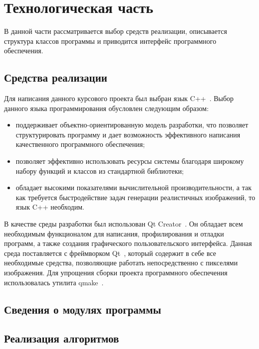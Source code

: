 \section{Технологическая часть}
В данной части рассматривается выбор средств реализации, описывается структура классов программы и приводится интерфейс программного обеспечения.

\subsection{Средства реализации}

Для написания данного курсового проекта был выбран язык C++~\cite{cpp-lang}.
Выбор данного языка программирования обусловлен следующим образом:
\begin{itemize}
	\item поддерживает объектно-ориентированную модель разработки, что позволяет структурировать программу и дает возможность эффективного написания качественного программного обеспечения;
	\item позволяет эффективно использовать ресурсы системы благодаря широкому набору функций и классов из стандартной библиотеки;
	\item обладает высокими показателями вычислительной производительности, а так как требуется быстродействие задач генерации реалистичных изображений, то язык C++ необходим.
\end{itemize}

В качестве среды разработки был использован Qt Creator~\cite{qt-creator}. 
Он обладает всем необходимым функционалом для написания, профилирования и отладки программ, а также создания графического пользовательского интерфейса.
Данная среда поставляется с фреймворком Qt~\cite{qt-framefork}, который содержит в себе все необходимые средства, позволяющие работать непосредственно с пикселями изображения.
Для упрощения сборки проекта программного обеспечения использовалась утилита qmake~\cite{qmake}.

\subsection{Сведения о модулях программы}

\subsection{Реализация алгоритмов}


